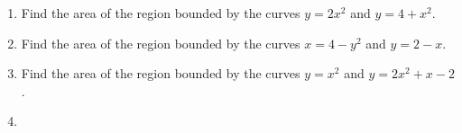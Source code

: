 \begin{enumerate}[ref={\fcProblemRef}]
\item \label{problemAreaBetweeny=2x^2,y=4+x^2} Find the area of the region bounded by the curves $y = 2x^2$ and $y = 4 + x^2$.

\item \label{problemAreaBetweeny=2-x,x=4-y^2} Find the area of the region bounded by the curves $x = 4 - y^2$ and $y = 2 - x$.

\item \label{problemAreaBetweeny=x^2} Find the area of the region bounded by the curves $y=x^2$ and $y=2x^2+x-2$.



\item 
\end{enumerate}

